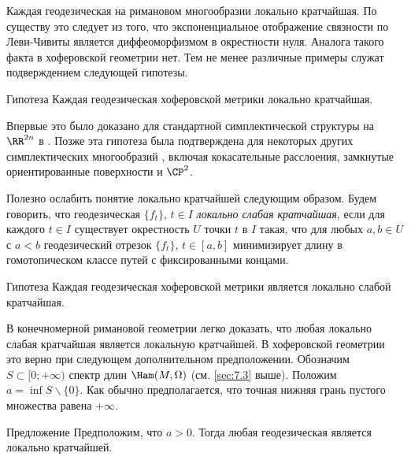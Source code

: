 Каждая геодезическая на римановом многообразии локально кратчайшая.
По существу это следует из того, что экспоненциальное отображение связности по Леви-Чивиты является диффеоморфизмом в окрестности нуля.
Аналога такого факта в хоферовской геометрии нет.
Тем не менее различные примеры служат подверждением следующей гипотезы.

\begin{thm}{Гипотеза}\label{12.6.A}
Каждая геодезическая хоферовской метрики локально кратчайшая.
\end{thm}

Впервые это было доказано для стандартной симплектической структуры на $\RR^{2n}$ в \cite{BP1}.
Позже эта гипотеза была подтверждена для некоторых других симплектических многообразий \cite{LM2}, включая кокасательные расслоения, замкнутые ориентированные поверхности и $\CP^2$.

Полезно ослабить понятие локально кратчайшей следующим образом.
Будем говорить, что геодезическая $\{f_t\}$, $t\in I$ \emph{локально слабая кратчайшая}, если для каждого $t\in I$ существует окрестность $U$ точки $t$ в $I$ такая, что для любых $a, b\in U$ с $a < b$ геодезический отрезок $\{f_t\}$, $t\in [a, b]$ минимизирует длину в гомотопическом классе путей с фиксированными концами.

\begin{thm}{Гипотеза}\label{12.6.B}
Каждая геодезическая хоферовской метрики является локально слабой кратчайшая.
\end{thm}

В конечномерной римановой геометрии легко доказать, что любая локально слабая кратчайшая является локальную кратчайшей.
В хоферовской геометрии это верно при следующем дополнительном предположении.
Обозначим $S \subset [0; +\infty)$ спектр длин $\Ham(M, \Omega)$ (см. \ref{sec:7.3} выше).
Положим $a = \inf S\backslash\{0\}$.
Как обычно предполагается, что точная нижняя грань пустого множества равена $+\infty$.

\begin{thm}[(\cite{LM2})]{Предложение}\label{12.6.C}
Предположим, что $a>0$.
Тогда любая геодезическая является локально кратчайшей.
\end{thm}

